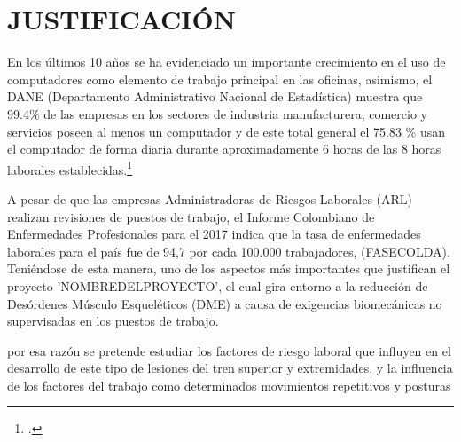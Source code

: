 \chapter{JUSTIFICACIÓN}
En los últimos 10 años se ha evidenciado un importante crecimiento en el uso de computadores como elemento de trabajo principal en las oficinas, asimismo, el DANE (Departamento Administrativo Nacional de Estadística)  muestra que 99.4\% de las empresas en los sectores de industria manufacturera, comercio y servicios poseen al menos un computador y de este total general el 75.83 \% usan el computador de forma diaria durante aproximadamente 6 horas de las 8 horas laborales establecidas.\footcite[]{Dane2013IndicadoresEmpresas}

A pesar de que las empresas Administradoras de Riesgos Laborales (ARL) realizan revisiones de puestos de trabajo, el Informe Colombiano de Enfermedades Profesionales para el 2017 indica que la tasa de enfermedades laborales para el país fue de 94,7 por cada 100.000 trabajadores, (FASECOLDA). Teniéndose de esta manera, uno de los aspectos más importantes que justifican el proyecto 'NOMBREDELPROYECTO', el cual gira entorno a la reducción de Desórdenes Músculo Esqueléticos (DME) a causa de exigencias biomecánicas no supervisadas en los puestos de trabajo.


por esa razón se pretende estudiar los factores de riesgo laboral que influyen en el desarrollo de este tipo de lesiones del tren superior y extremidades, y la influencia de los factores del trabajo como determinados movimientos repetitivos y posturas

